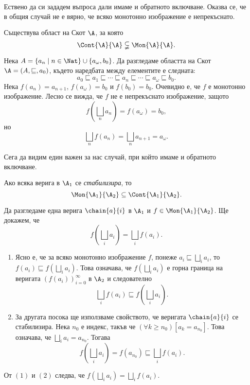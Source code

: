 Ествено да си зададем въпроса дали имаме и обратното включване.
Оказва се, че в общия случай не е вярно, че всяко монотонно изображение е непрекъснато.

\begin{prop}
  Съществува област на Скот $\A$, за която
  \[\Cont{\A}{\A} \subsetneqq \Mon{\A}{\A}.\]
\end{prop}
\begin{hint}
  Нека $A = \{a_n \mid n \in \Nat\} \cup \{a_\omega, b_0\}$.
  Да разгледаме областта на Скот $\A = (A, \sqsubseteq, a_0)$, където 
  наредбата между елементите е следната:
  \[a_0 \sqsubseteq a_1 \sqsubseteq \cdots \sqsubseteq a_n \sqsubseteq \cdots \sqsubseteq a_\omega \sqsubseteq b_0. \]
  Нека $f(a_n) = a_{n+1}$, $f(a_{\omega}) = b_0$ и $f(b_0) = b_0$.
  Очевидно е, че $f$ е монотонно изображение.
  Лесно се вижда, че $f$ не е непрекъснато изображение, 
  защото
  \[f(\bigsqcup_n a_n) = f(a_\omega) = b_0,\]
  но 
  \[\bigsqcup_n f(a_n) = \bigsqcup_n a_{n+1} = a_\omega.\]
\end{hint}

Сега да видим един важен за нас случай, при който имаме и обратното включване.

\begin{framed}
  \begin{prop}
    \label{pr:stab-continuous}
    Ако всяка верига в $\A_1$ се {\em стабилизира}, то
    \[\Mon{\A_1}{\A_2} \subseteq \Cont{\A_1}{\A_2}.\]
  \end{prop}  
\end{framed}
\begin{hint}
  Да разгледаме една верига $\chain{a}{i}$ в $\A_1$ и $f \in \Mon{\A_1}{\A_2}$.
  Ще докажем, че \[f(\bigsqcup_i a_i) = \bigsqcup_i f(a_i).\]

  \begin{enumerate}[(1)]
  \item
    Ясно е, че за всяко монотонно изображение $f$,
    понеже $a_i \sqsubseteq \bigsqcup_i a_i$, то $f(a_i) \sqsubseteq f(\bigsqcup_i a_i)$.
    Това означава, че $f(\bigsqcup_i a_i)$ е горна граница на веригата $(f(a_i))^\infty_{i=0}$ в $\A_2$
    и следователно
    \[\bigsqcup_i f(a_i) \sqsubseteq f(\bigsqcup_i a_i).\]
  \item
    За другата посока ще използваме свойството, че веригата $\chain{a}{i}$ се стабилизира.
    Нека $n_0$ е индекс, такъв че $(\forall k \geq n_0)[a_k = a_{n_0}]$.
    Това означава, че $\bigsqcup_i a_i = a_{n_0}$.
    Тогава
    \[f(\bigsqcup_i a_i) = f(a_{n_0}) \sqsubseteq \bigsqcup_i f(a_i).\]
  \end{enumerate}
  
  От $(1)$ и $(2)$ следва, че $f(\bigsqcup_i a_i) = \bigsqcup_i f(a_i)$.
\end{hint}

